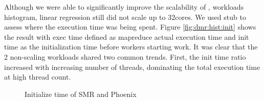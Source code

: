 Although we were able to significantly improve the scalability of \myds, 
workloads histogram, linear regression still did not scale up to 32cores. 
We used stub to assess where the execution time was
being spent. 
Figure \ref{fig:dmr:hist:init} shows the result with exec time
defined as mapreduce actual execution time and init time as the initialization time before workers starting work. 
It was clear that the 2 non-scaling workloads shared two common trends. 
First, the init time ratio increased with increasing number of threads, 
dominating the total execution time at high thread count. 

\begin{figure}[htpb]
\centering
  \caption{Initialize time of SMR and Phoenix}
   \label{fig:time}
\end{figure}





